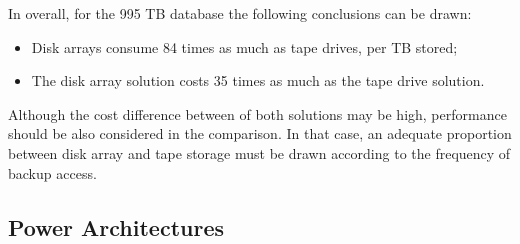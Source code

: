 {                \begin{table}[h!tb]
                \centering 
                \label{tab:disk_array_power_costs} %
                \end{table}
                In overall, for the 995 TB database the following conclusions can be drawn:
                \begin{itemize}
	                \item Disk arrays consume 84 times as much as tape drives, per TB stored;
	                \item The disk array solution costs 35 times as much as the tape drive solution.
                \end{itemize}
                Although the cost difference between of both solutions may be high, performance should be also considered in the comparison. In that case, an adequate proportion between disk array and tape storage must be drawn according to the frequency of backup access.

        \subsection{Power Architectures} \label{sec2:power_architectures}
}
